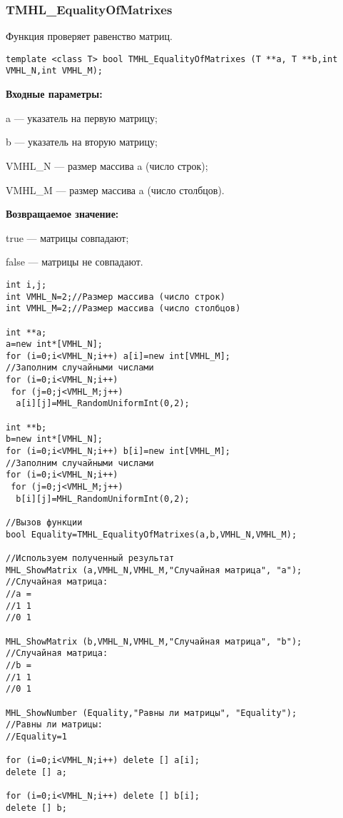 \documentclass[a4paper,12pt]{article}
\begin{document}
\subsubsection{TMHL\_EqualityOfMatrixes}\label{TMHL_EqualityOfMatrixes}

Функция проверяет равенство матриц.


\begin{lstlisting}[label=code_syntax_TMHL_EqualityOfMatrixes,caption=Синтаксис]
template <class T> bool TMHL_EqualityOfMatrixes (T **a, T **b,int VMHL_N,int VMHL_M);
\end{lstlisting}

\textbf{Входные параметры:}

a --- указатель на первую матрицу;
 
b --- указатель на вторую матрицу;
 
VMHL\_N --- размер массива a (число строк);
 
VMHL\_M --- размер массива a (число столбцов).

\textbf{Возвращаемое значение:}
 
 true --- матрицы совпадают;
 
false --- матрицы не совпадают.


\begin{lstlisting}[label=code_use_TMHL_EqualityOfMatrixes,caption=Пример использования]
int i,j;
int VMHL_N=2;//Размер массива (число строк)
int VMHL_M=2;//Размер массива (число столбцов)

int **a;
a=new int*[VMHL_N];
for (i=0;i<VMHL_N;i++) a[i]=new int[VMHL_M];
//Заполним случайными числами
for (i=0;i<VMHL_N;i++)
 for (j=0;j<VMHL_M;j++)
  a[i][j]=MHL_RandomUniformInt(0,2);

int **b;
b=new int*[VMHL_N];
for (i=0;i<VMHL_N;i++) b[i]=new int[VMHL_M];
//Заполним случайными числами
for (i=0;i<VMHL_N;i++)
 for (j=0;j<VMHL_M;j++)
  b[i][j]=MHL_RandomUniformInt(0,2);

//Вызов функции
bool Equality=TMHL_EqualityOfMatrixes(a,b,VMHL_N,VMHL_M);

//Используем полученный результат
MHL_ShowMatrix (a,VMHL_N,VMHL_M,"Случайная матрица", "a");
//Случайная матрица:
//a =	
//1	1
//0	1

MHL_ShowMatrix (b,VMHL_N,VMHL_M,"Случайная матрица", "b");
//Случайная матрица:
//b =	
//1	1
//0	1

MHL_ShowNumber (Equality,"Равны ли матрицы", "Equality");
//Равны ли матрицы:
//Equality=1

for (i=0;i<VMHL_N;i++) delete [] a[i];
delete [] a;

for (i=0;i<VMHL_N;i++) delete [] b[i];
delete [] b;
\end{lstlisting}
\end{document}
